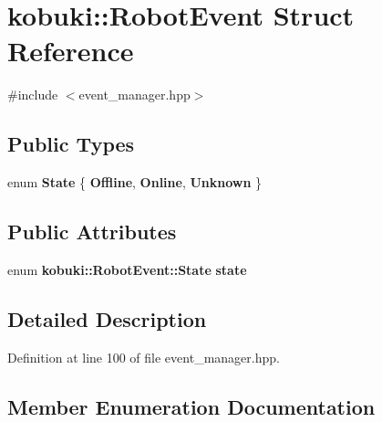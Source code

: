 \section{kobuki\-:\-:\-Robot\-Event \-Struct \-Reference}
\label{structkobuki_1_1RobotEvent}


{\ttfamily \#include $<$event\-\_\-manager.\-hpp$>$}

\subsection*{\-Public \-Types}
\begin{DoxyCompactItemize}
\item 
enum {\bf \-State} \{ {\bf \-Offline}, 
{\bf \-Online}, 
{\bf \-Unknown}
 \}
\end{DoxyCompactItemize}
\subsection*{\-Public \-Attributes}
\begin{DoxyCompactItemize}
\item 
enum {\bf kobuki\-::\-Robot\-Event\-::\-State} {\bf state}
\end{DoxyCompactItemize}


\subsection{\-Detailed \-Description}


\-Definition at line 100 of file event\-\_\-manager.\-hpp.



\subsection{\-Member \-Enumeration \-Documentation}
